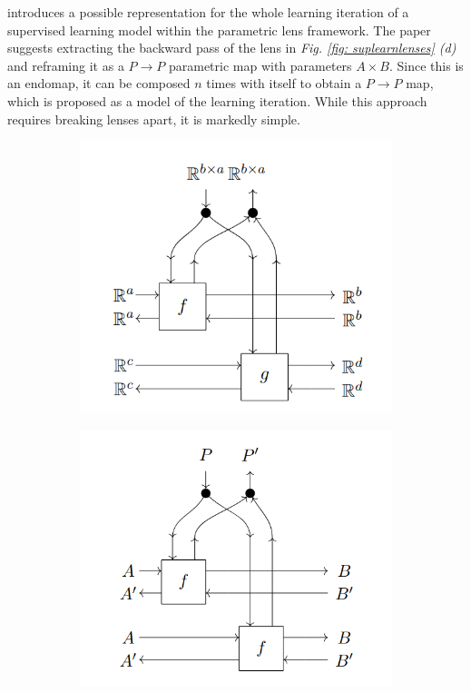 \documentclass[11pt,a4paper,openright,twoside]{report}
\theoremstyle{plain}
\theoremstyle{definition}
\begin{document}
\cite{cruttwell2022categorical} introduces a possible representation for the whole learning iteration of a supervised learning model within the parametric lens framework. The paper suggests extracting the backward pass of the lens in \textit{Fig. \ref{fig: suplearnlenses} (d)} and reframing it as a $P \to P$ parametric map with parameters $A \times B$. Since this is an endomap, it can be composed $n$ times with itself to obtain a $P \to P$ map, which is proposed as a model of the learning iteration. While this approach requires breaking lenses apart, it is markedly simple.

\begin{figure}[h]
  \begin{center}
    \begin{subfigure}{0.3\textwidth}
      \includegraphics[width=\textwidth]{figures/weight_tying.png}
      \caption{}
    \end{subfigure}
    \begin{subfigure}{0.3\textwidth}
      \includegraphics[width=\textwidth]{figures/batching.png}

\end{subfigure}
\end{center}
\end{figure}
\end{document}
